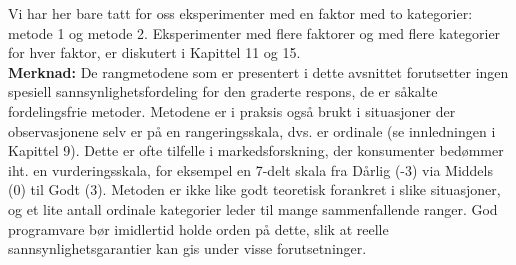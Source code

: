 Vi har her bare tatt for oss eksperimenter med en faktor med to kate\-gorier:
 metode 1 og metode 2. Eksperimenter med flere faktorer og med flere
kategorier for hver faktor, er diskutert i Kapittel 11 og 15. \\

\noindent
{\bf Merknad:} De rangmetodene som er presentert i dette avsnittet forutsetter
ingen spesiell sannsynlighetsfordeling for den graderte respons, de er
såkalte fordelingsfrie metoder. Metodene er i praksis også brukt i
situasjoner der observasjonene selv er på en rangeringsskala, dvs. er
ordinale (se innledningen i Kapittel 9). Dette er ofte tilfelle i
markedsforskning, der konsumenter bedømmer iht. en vurderingsskala,
for eksempel en 7-delt skala fra Dårlig {(-3)} via Middels (0) til Godt (3).
Metoden er ikke like godt teoretisk forankret i slike situasjoner, og et lite
antall ordinale kategorier leder til mange sammenfallende ranger.
God programvare bør imidlertid holde orden på dette, slik at reelle
sannsynlighetsgarantier kan gis under visse forutsetninger.


